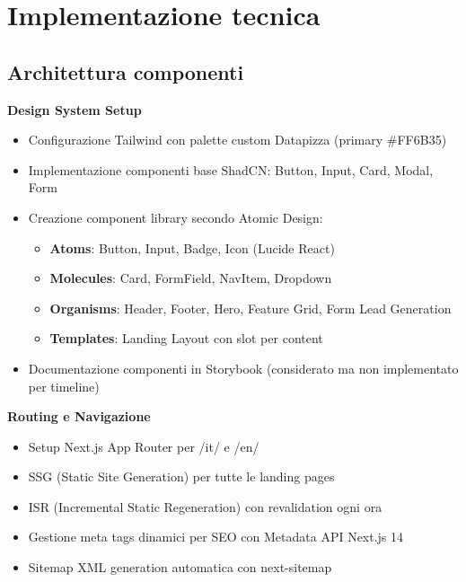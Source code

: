 \section{Implementazione tecnica}

\subsection{Architettura componenti}
\textbf{Design System Setup}
\begin{itemize}
  \item Configurazione Tailwind con palette custom Datapizza 
        (primary \#FF6B35)
  \item Implementazione componenti base ShadCN: Button, Input, Card, 
        Modal, Form
  \item Creazione component library secondo Atomic Design:
    \begin{itemize}
      \item \textbf{Atoms}: Button, Input, Badge, Icon (Lucide React)
      \item \textbf{Molecules}: Card, FormField, NavItem, Dropdown
      \item \textbf{Organisms}: Header, Footer, Hero, Feature Grid, 
            Form Lead Generation
      \item \textbf{Templates}: Landing Layout con slot per content
    \end{itemize}
  \item Documentazione componenti in Storybook (considerato ma non 
        implementato per timeline)
\end{itemize}

\textbf{Routing e Navigazione}
\begin{itemize}
  \item Setup Next.js App Router per /it/ e /en/
  \item SSG (Static Site Generation) per tutte le landing pages
  \item ISR (Incremental Static Regeneration) con revalidation ogni ora
  \item Gestione meta tags dinamici per SEO con Metadata API Next.js 14
  \item Sitemap XML generation automatica con next-sitemap
\end{itemize}

